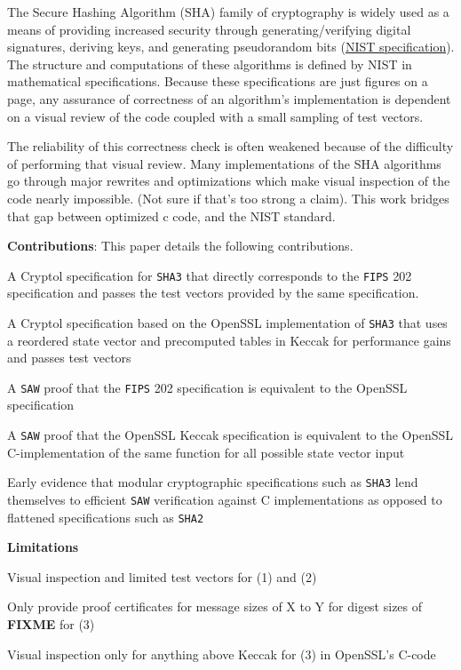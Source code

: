   The Secure Hashing Algorithm (SHA) family of cryptography is widely used as a means of providing increased security through generating/verifying digital signatures, deriving keys, and generating pseudorandom bits (\href{https://csrc.nist.gov/publications/detail/fips/202/final}{NIST specification}).  
  The structure and computations of these algorithms is defined by NIST in mathematical specifications.  
  Because these specifications are just figures on a page, any assurance of correctness of an algorithm’s implementation is dependent on a visual review of the code coupled with a small sampling of test vectors.
  
  The reliability of this correctness check is often weakened because of the difficulty of performing that visual review.  
  Many implementations of the SHA algorithms go through major rewrites and optimizations which make visual inspection of the code nearly impossible. (Not sure if that’s too strong a claim).
  This work bridges that gap between optimized c code, and the NIST standard.
  
\noindent \textbf{Contributions}:
This paper details the following contributions.
\begin{compactitem}
  \item  A Cryptol specification for \texttt{SHA3} that directly corresponds to the \texttt{FIPS} 202 specification and passes the test vectors provided by the same specification.
  \item A Cryptol specification based on the OpenSSL implementation of \texttt{SHA3} that uses a reordered state vector and precomputed tables in Keccak for performance gains and passes test vectors
  \item A \texttt{SAW} proof that the \texttt{FIPS} 202 specification is equivalent to the OpenSSL specification
  \item A \texttt{SAW} proof that the OpenSSL Keccak specification is equivalent to the OpenSSL C-implementation of the same function for all possible state vector input
  \item Early evidence that modular cryptographic specifications such as \texttt{SHA3} lend themselves to efficient \texttt{SAW} verification against C implementations as opposed to flattened specifications such as \texttt{SHA2} 
\end{compactitem}

\noindent \textbf{Limitations}
\begin{compactitem}
  \item Visual inspection and limited test vectors for (1) and (2)
  \item Only provide proof certificates for message sizes of X to Y for digest sizes of \textbf{FIXME} for (3)
  \item Visual inspection only for anything above Keccak for (3) in OpenSSL's C-code
\end{compactitem}

